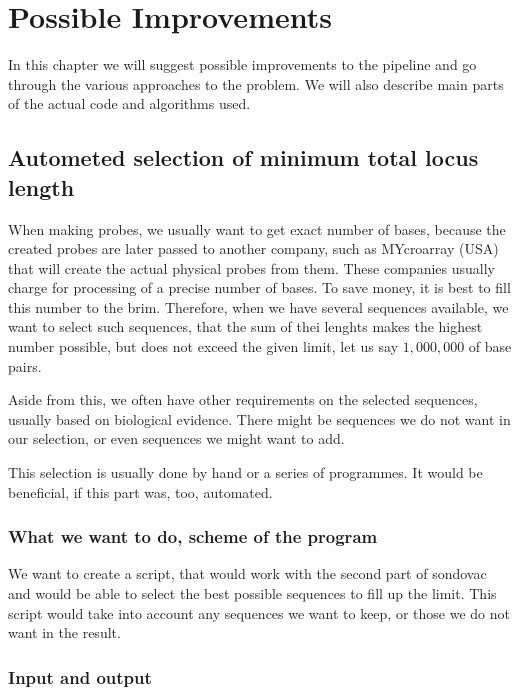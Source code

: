 \chapter[Possible Improvements]{Possible Improvements}
\label{kap:improvements}

In this chapter we will suggest possible improvements to the pipeline and go through the various approaches to the problem. 
We will also describe main parts of the actual code and algorithms used. 

\section{Autometed selection of minimum total locus length}

When making probes, we usually want to get exact number of bases, because the created probes are later passed to another 
company, such as MYcroarray (USA) \cite{mycroarray} that will create the actual physical probes from them. These companies 
usually charge for processing of a precise number of bases. To save money, it is best to fill this number to the brim. 
Therefore, when we have several sequences available, we want to select such sequences, that the sum of thei lenghts makes the 
highest number possible, but does not exceed the given limit, let us say $1,000,000$ of base pairs. 

Aside from this, we often have other requirements on the selected sequences, usually based on biological evidence. There might be 
sequences we do not want in our selection, or even sequences we might want to add. 

This selection is usually done by hand or a series of programmes. It would be beneficial, if this part was, too, automated. 

\subsection{What we want to do, scheme of the program}

We want to create a script, that would work with the second part of sondovac and would be able to select the best possible 
sequences to fill up the limit. This script would take into account any sequences we want to keep, or those we do not want in 
the result. 

\subsection{Input and output}

